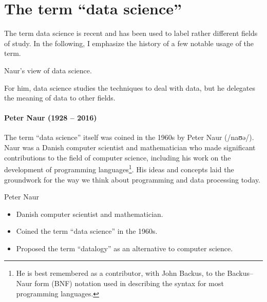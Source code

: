 \section{The term ``data science''}

The term data science is recent and has been used to label rather different fields of
study.  In the following, I emphasize the history of a few notable usage of the term.

\def\naurds{(0,0) circle (20mm)}
\def\naurcs{(0:5mm) circle (15mm)}
\def\naurde{(0:40mm) circle (15mm)}



\begin{figurebox}[label=fig:naur]{Naur's view of data science.}
  \centering
  \tcblower
    For him, data science studies the techniques to deal
    with data, but he delegates the meaning of data to other fields.
\end{figurebox}

\paragraph{Peter Naur (1928 -- 2016)}

The term ``data science'' itself was coined in the 1960s by Peter Naur (/naʊə/). Naur was
a Danish computer scientist and mathematician who made significant contributions to the
field of computer science, including his work on the development of programming
languages\footnote{He is best remembered as a contributor, with John Backus, to the
Backus–Naur form (BNF) notation used in describing the syntax for most programming
languages.}.
His ideas and concepts laid the groundwork for the way we think about programming and data
processing today.

\begin{mainbox}{Peter Naur}
  \begin{itemize}
    \item Danish computer scientist and mathematician.
    \item Coined the term ``data science'' in the 1960s.
    \item Proposed the term ``datalogy'' as an alternative to computer science.
  \end{itemize}
\end{mainbox}

